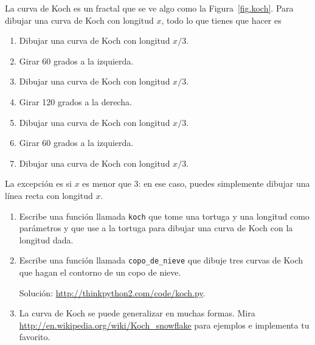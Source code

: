 \documentclass[10pt]{book}
\begin{document}
\begin{exercise}

La curva de Koch es un fractal que se ve algo como la
Figura~\ref{fig.koch}.  Para dibujar una curva de Koch con longitud $x$, todo lo que
tienes que hacer es

\begin{enumerate}

\item Dibujar una curva de Koch con longitud $x/3$.

\item Girar 60 grados a la izquierda.

\item Dibujar una curva de Koch con longitud $x/3$.

\item Girar 120 grados a la derecha.

\item Dibujar una curva de Koch con longitud $x/3$.

\item Girar 60 grados a la izquierda.

\item Dibujar una curva de Koch con longitud $x/3$.

\end{enumerate}

La excepción es si $x$ es menor que 3: en ese caso,
puedes simplemente dibujar una línea recta con longitud $x$.

\begin{enumerate}

\item Escribe una función llamada {\tt koch} que tome una tortuga y
una longitud como parámetros y que use a la tortuga para dibujar una curva de Koch
con la longitud dada.

\item Escribe una función llamada {\tt copo\_de\_nieve} que dibuje tres
curvas de Koch que hagan el contorno de un copo de nieve.

Solución: \url{http://thinkpython2.com/code/koch.py}.

\item La curva de Koch se puede generalizar en muchas formas.  Mira
\url{http://en.wikipedia.org/wiki/Koch_snowflake} para ejemplos e
implementa tu favorito.

\end{enumerate}
\end{exercise}
\end{document}
